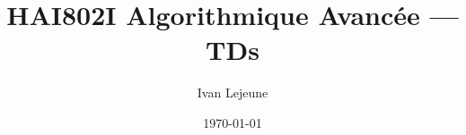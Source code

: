 







\title{\color{astral} \sffamily \bfseries HAI802I Algorithmique Avancée --- TDs}
\author{Ivan Lejeune}
\date{\today}

\toggletrue{showsolutions}


    \maketitle
    \tableofcontents

    \newpage
    \listofproblems %

    \newpage
    \setcounter{tdcounter}{0}
    
    \newpage
    
    \newpage
    
    \newpage
    
    \newpage
    
    \newpage
    
    \newpage
    
    \newpage
    
    



